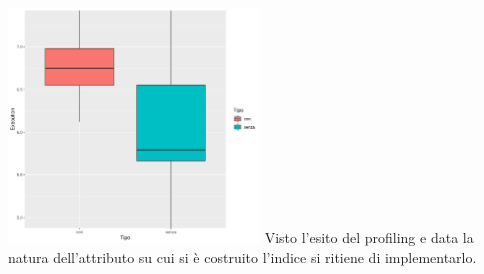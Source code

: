 \documentclass{article}
\begin{document}
\includegraphics[width=0.5\textwidth]{execution_impiegato_dataAssunzione_modifica.png}
\newline
\newline
Visto l'esito del profiling e data la natura dell'attributo su cui si è costruito l'indice si ritiene di implementarlo.

\newpage
\end{document}
